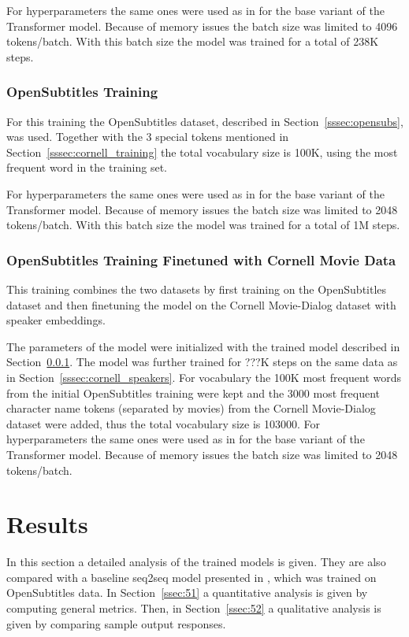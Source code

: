 \documentclass[12pt]{article}
\begin{document}
For hyperparameters the same ones were used as in \cite{Vaswani:2017} for the base variant of the Transformer model. Because of memory issues the batch size was limited to 4096 tokens/batch. With this batch size the model was trained for a total of 238K steps.
\subsubsection{OpenSubtitles Training} \label{sssec:opensubs_training}
For this training the OpenSubtitles dataset, described in Section~\ref{sssec:opensubs}, was used. Together with the 3 special tokens mentioned in Section~\ref{sssec:cornell_training} the total vocabulary size is 100K, using the most frequent word in the training set.

For hyperparameters the same ones were used as in \cite{Vaswani:2017} for the base variant of the Transformer model. Because of memory issues the batch size was limited to 2048 tokens/batch. With this batch size the model was trained for a total of 1M steps.
\subsubsection{OpenSubtitles Training Finetuned with Cornell Movie Data} \label{sssec:finetune_training}
This training combines the two datasets by first training on the OpenSubtitles dataset and then finetuning the model on the Cornell Movie-Dialog dataset with speaker embeddings. 

The parameters of the model were initialized with the trained model described in Section~\ref{sssec:opensubs_training}. The model was further trained for ???K steps on the same data as in Section~\ref{sssec:cornell_speakers}. For vocabulary the 100K most frequent words from the initial OpenSubtitles training were kept and the 3000 most frequent character name tokens (separated by movies) from the Cornell Movie-Dialog dataset were added, thus the total vocabulary size is 103000. For hyperparameters the same ones were used as in \cite{Vaswani:2017} for the base variant of the Transformer model. Because of memory issues the batch size was limited to 2048 tokens/batch.

\newpage\section{Results} \label{sec:results}
In this section a detailed analysis of the trained models is given. They are also compared with a baseline seq2seq model presented in \cite{Vinyals:2015}, which was trained on OpenSubtitles data. In Section~\ref{ssec:51} a quantitative analysis is given by computing general metrics. Then, in Section~\ref{ssec:52} a qualitative analysis is given by comparing sample output responses.
\end{document}

